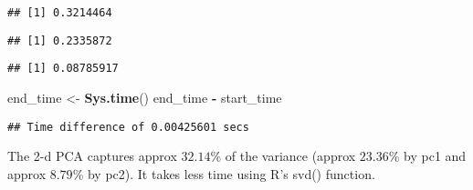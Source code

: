 \documentclass[]{article}
\newenvironment{Shaded}{\begin{snugshade}}{\end{snugshade}}
\newcommand{\CommentTok}[1]{\textcolor[rgb]{0.56,0.35,0.01}{\textit{#1}}}
\newcommand{\DecValTok}[1]{\textcolor[rgb]{0.00,0.00,0.81}{#1}}
\newcommand{\KeywordTok}[1]{\textcolor[rgb]{0.13,0.29,0.53}{\textbf{#1}}}
\newcommand{\NormalTok}[1]{#1}
\newcommand{\OperatorTok}[1]{\textcolor[rgb]{0.81,0.36,0.00}{\textbf{#1}}}
\newcommand{\StringTok}[1]{\textcolor[rgb]{0.31,0.60,0.02}{#1}}
\begin{document}
\begin{verbatim}
## [1] 0.3214464
\end{verbatim}

\begin{Shaded}
\end{Shaded}

\begin{verbatim}
## [1] 0.2335872
\end{verbatim}

\begin{Shaded}
\end{Shaded}

\begin{verbatim}
## [1] 0.08785917
\end{verbatim}

\begin{Shaded}
\begin{Highlighting}[]
\NormalTok{end_time <-}\StringTok{ }\KeywordTok{Sys.time}\NormalTok{() }
\NormalTok{end_time  }\OperatorTok{-}\StringTok{ }\NormalTok{start_time}
\end{Highlighting}
\end{Shaded}

\begin{verbatim}
## Time difference of 0.00425601 secs
\end{verbatim}

The 2-d PCA captures approx \(32.14\)\% of the variance (approx
\(23.36\)\% by pc1 and approx \(8.79\)\% by pc2). It takes less time
using R's svd() function.
\end{document}

